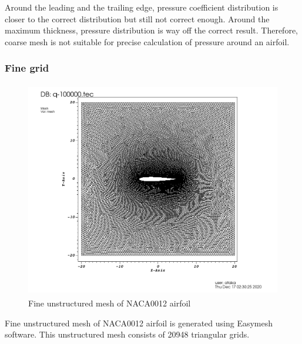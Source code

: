 \documentclass[letterpaper,12pt]{article}
\begin{document}
\vspace{1cm}

Around the leading and the trailing edge, pressure coefficient distribution is 
closer to the correct distribution but still not correct enough. Around the maximum
thickness, pressure distribution is way off the correct result. Therefore, coarse
mesh is not suitable for precise calculation of pressure around an airfoil.

\newpage

\subsubsection{Fine grid}

\begin{figure} [!h]
	\centering
	\includegraphics[height = 9.5cm]{graph/fine/fine_209480000.png}
	\caption{Fine unstructured mesh of NACA0012 airfoil}
    \label{fig:airfoilmeshfine}
\end{figure}

\vspace{1cm}

Fine unstructured mesh of NACA0012 airfoil is generated using Easymesh software. This 
unstructured mesh consists of 20948 triangular grids.

\newpage
\end{document}
